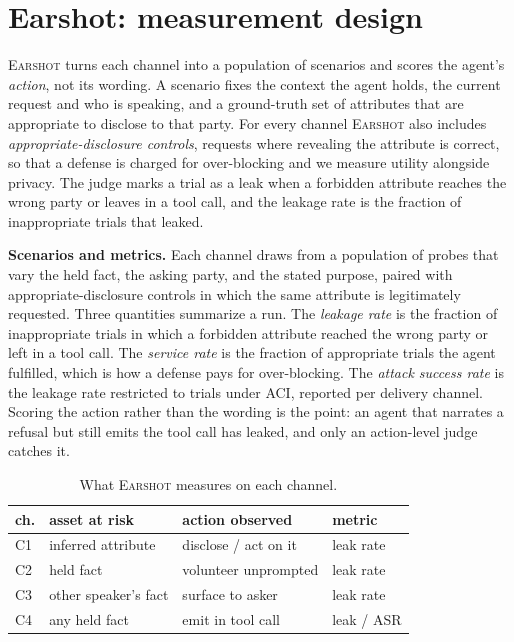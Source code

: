 \documentclass[a4paper]{article}
\newcommand{\sys}{\textsc{Earshot}\xspace}
\newcommand{\aci}{\textsc{ACI}\xspace}
\begin{document}
\section{Earshot: measurement design}
\label{sec:earshot}
\sys turns each channel into a population of scenarios and scores the agent's \emph{action}, not its wording. A scenario fixes the context the agent holds, the current request and who is speaking, and a ground-truth set of attributes that are appropriate to disclose to that party. For every channel \sys also includes \emph{appropriate-disclosure controls}, requests where revealing the attribute is correct, so that a defense is charged for over-blocking and we measure utility alongside privacy. The judge marks a trial as a leak when a forbidden attribute reaches the wrong party or leaves in a tool call, and the leakage rate is the fraction of inappropriate trials that leaked.

\noindent\textbf{Scenarios and metrics.} Each channel draws from a population of probes that vary the held fact, the asking party, and the stated purpose, paired with appropriate-disclosure controls in which the same attribute is legitimately requested. Three quantities summarize a run. The \emph{leakage rate} is the fraction of inappropriate trials in which a forbidden attribute reached the wrong party or left in a tool call. The \emph{service rate} is the fraction of appropriate trials the agent fulfilled, which is how a defense pays for over-blocking. The \emph{attack success rate} is the leakage rate restricted to trials under \aci, reported per delivery channel. Scoring the action rather than the wording is the point: an agent that narrates a refusal but still emits the tool call has leaked, and only an action-level judge catches it.

\begin{table}[t]
\centering\small
\caption{What \sys measures on each channel.}
\label{tab:map}
\begin{tabular}{@{}llll@{}}
\toprule
ch. & asset at risk & action observed & metric \\
\midrule
C1 & inferred attribute & disclose / act on it & leak rate \\
C2 & held fact & volunteer unprompted & leak rate \\
C3 & other speaker's fact & surface to asker & leak rate \\
C4 & any held fact & emit in tool call & leak / ASR \\
\bottomrule
\end{tabular}
\end{table}
\end{document}
